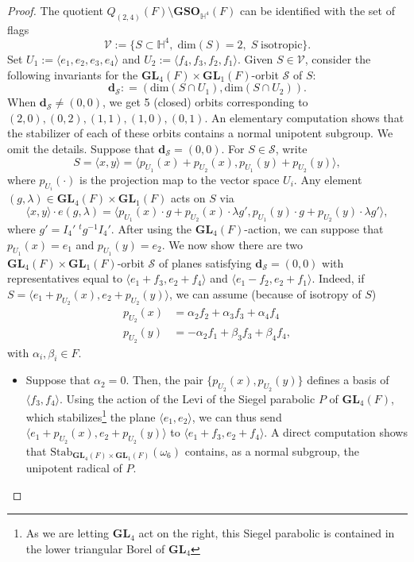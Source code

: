 \documentclass[11pt, reqno]{amsart}
\theoremstyle{plain}
\theoremstyle{definition}
\theoremstyle{remark}
\theoremstyle{plain}
\def\GL{\mathbf{GL}}
\begin{document}
\begin{proof}
    The quotient $Q_{(2,4)}(F)\setminus \mathbf{GSO}_{\mathbb{H}^4}(F)$ can be identified with the set of flags $$\mathcal{V} := \{S\subset \mathbb{H}^4,\;\mathrm{dim}(S) = 2,\;S\;\text{isotropic}\}.$$ Set $U_1 := \langle e_1,e_2,e_3,e_4\rangle $ and $U_2 := \langle f_4,f_3,f_2,f_1\rangle$. Given $S\in \mathcal{V}$, consider the following invariants for the $\GL_4(F) \times \GL_1(F)$-orbit $\mathcal{S}$ of $S$:
    \[ \mathbf{d}_\mathcal{S} : = (\mathrm{dim}(S\cap U_1), \mathrm{dim}(S\cap U_2)).\]
    When $\mathbf{d}_\mathcal{S} \ne (0,0)$, we get 5 (closed) orbits corresponding to $(2,0),(0,2),(1,1),(1,0),(0,1)$. An elementary computation shows that the stabilizer of each of these orbits contains a normal unipotent subgroup. We omit the details. Suppose that $\mathbf{d}_\mathcal{S} = (0,0)$. For $S \in \mathcal{S}$, write
\begin{equation}\label{Expression:Projections:Final:Double}
    S = \langle x,y\rangle  = \langle p_{U_1}(x)+p_{U_2}(x),p_{U_1}(y)+p_{U_2}(y)\rangle,
    \end{equation}
    where $p_{U_i}(\cdot)$ is the projection map to the vector space $U_i$. Any element $(g,\lambda)\in \GL_4(F)\times \GL_1(F)$ acts on $S$ via
    \[ \langle x,y\rangle \cdot e(g,\lambda) = \langle  p_{U_1}(x) \cdot g +  p_{U_2}(x) \cdot \lambda g', p_{U_1}(y) \cdot  g +  p_{U_2}(y)\cdot \lambda g'\rangle,\]
    where $g' = I_4'\;^{t}g^{-1}I_4'$. After using the $\GL_4(F)$-action, we can suppose that $p_{U_1}(x) = e_1$ and $p_{U_1}(y) = e_2$. We now show there are two $ \GL_4(F) \times \GL_1(F)$-orbit $\mathcal{S}$ of planes satisfying $\mathbf{d}_\mathcal{S} = (0,0)$ with representatives equal to $\langle e_1 + f_3, e_2 + f_4 \rangle$ and $\langle e_1 - f_2, e_2 + f_1 \rangle$. Indeed, if $S =  \langle e_1+p_{U_2}(x), e_2 +p_{U_2}(y)\rangle$, we can assume  (because of isotropy of $S$)
    \begin{align*}
    p_{U_2}(x) &= \alpha_2 f_2 + \alpha_3 f_3 +\alpha_4 f_4   \\ 
    p_{U_2}(y) &= -\alpha_2 f_1 + \beta_3 f_3 +\beta_4 f_4, 
     \end{align*}    
    with $\alpha_i,\beta_i \in F$. \begin{itemize} 
    \item Suppose that  $\alpha_2 = 0$. Then, the pair $\{p_{U_2}(x),    p_{U_2}(y) \}$ defines a basis of $\langle f_3 ,f_4 \rangle$. Using the action of the Levi of the Siegel parabolic $P$ of $\GL_4(F)$, which stabilizes\footnote{As we are letting $\GL_4$ act on the right, this Siegel parabolic is contained in the lower triangular Borel of $\GL_4$} the plane $\langle e_1 , e_2 \rangle$, we can thus send $\langle e_1+p_{U_2}(x), e_2 +p_{U_2}(y)\rangle$ to $\langle e_1+f_3, e_2 +f_4\rangle$.  A direct computation shows that $\mathrm{Stab}_{\GL_4(F)\times \GL_1(F)}(\omega_6)$ contains, as a normal subgroup, the unipotent radical of $P$. 

\end{itemize}
\end{proof}
\end{document}
